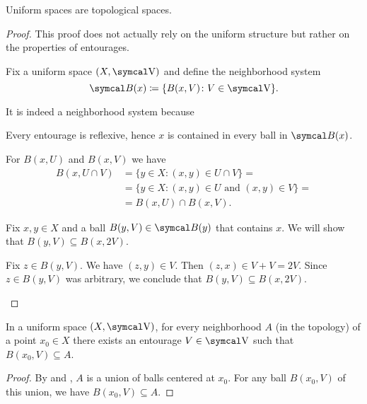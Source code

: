 \begin{proposition}\label{thm:uniform_spaces_are_topological}
  Uniform spaces are topological spaces.
\end{proposition}
\begin{proof}
  This proof does not actually rely on the uniform structure but rather on the properties of entourages.

  Fix a uniform space \( (X, \CV) \) and define the neighborhood system
  \begin{equation*}
    \Cal{B}(x) \coloneqq \{ B(x, V) \colon V \in \CV \}.
  \end{equation*}

  It is indeed a neighborhood system because
  \begin{description}
     Every entourage is reflexive, hence \( x \) is contained in every ball in \( \Cal{B}(x) \).

     For \( B(x, U) \) and \( B(x, V) \) we have
    \begin{align*}
      B(x, U \cap V)
      &=
      \{ y \in X \colon (x, y) \in U \cap V \}
      = \\ &=
      \{ y \in X \colon (x, y) \in U \text{ and } (x, y) \in V \}
      = \\ &=
      B(x, U) \cap B(x, V).
    \end{align*}

     Fix \( x, y \in X \) and a ball \( B(y, V) \in \Cal{B}(y) \) that contains \( x \). We will show that \( B(y, V) \subseteq B(x, 2V) \).

    Fix \( z \in B(y, V) \). We have \( (z, y) \in V \). Then \( (z, x) \in V + V = 2V \). Since \( z \in B(y, V) \) was arbitrary, we conclude that \( B(y, V) \subseteq B(x, 2V) \).
  \end{description}
\end{proof}

\begin{lemma}\label{thm:uniform_space_neighborhood_contains_ball}
  In a uniform space \( (X, \CV) \), for every neighborhood \( A \) (in the topology) of a point \( x_0 \in X \) there exists an entourage \( V \in \CV \) such that \( B(x_0, V) \subseteq A \).
\end{lemma}
\begin{proof}
  By  and , \( A \) is a union of balls centered at \( x_0 \). For any ball \( B(x_0, V) \) of this union, we have \( B(x_0, V) \subseteq A \).
\end{proof}

